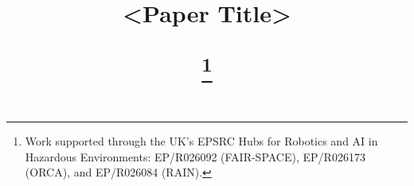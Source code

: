 
\title{
<Paper Title>

\thanks{Work supported through the UK's EPSRC Hubs for Robotics and AI in Hazardous Environments: EP/R026092 (FAIR-SPACE), EP/R026173 (ORCA), and EP/R026084 (RAIN).}
    
}
    